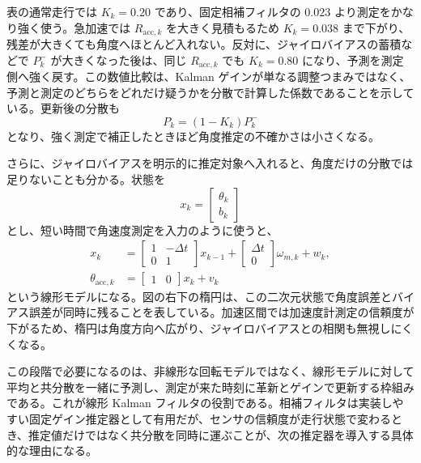 表の通常走行では $K_k=0.20$ であり、固定相補フィルタの $0.023$ より測定をかなり強く使う。急加速では $R_{\mathrm{acc},k}$ を大きく見積もるため $K_k=0.038$ まで下がり、残差が大きくても角度へほとんど入れない。反対に、ジャイロバイアスの蓄積などで $P^-_k$ が大きくなった後は、同じ $R_{\mathrm{acc},k}$ でも $K_k=0.80$ になり、予測を測定側へ強く戻す。この数値比較は、Kalman ゲインが単なる調整つまみではなく、予測と測定のどちらをどれだけ疑うかを分散で計算した係数であることを示している。更新後の分散も
\begin{equation}
  P_k=(1-K_k)P^-_k
\end{equation}
となり、強く測定で補正したときほど角度推定の不確かさは小さくなる。

さらに、ジャイロバイアスを明示的に推定対象へ入れると、角度だけの分散では足りないことも分かる。状態を
\begin{equation}
  x_k=
  \begin{bmatrix}
    \theta_k\\
    b_k
  \end{bmatrix}
\end{equation}
とし、短い時間で角速度測定を入力のように使うと、
\begin{align}
  x_k
  &=
  \begin{bmatrix}
    1 & -\Delta t\\
    0 & 1
  \end{bmatrix}
  x_{k-1}
  +
  \begin{bmatrix}
    \Delta t\\
    0
  \end{bmatrix}
  \omega_{m,k}
  +w_k,\\
  \theta_{\mathrm{acc},k}
  &=
  \begin{bmatrix}
    1 & 0
  \end{bmatrix}
  x_k+v_k
\end{align}
という線形モデルになる。図の右下の楕円は、この二次元状態で角度誤差とバイアス誤差が同時に残ることを表している。加速区間では加速度計測定の信頼度が下がるため、楕円は角度方向へ広がり、ジャイロバイアスとの相関も無視しにくくなる。

この段階で必要になるのは、非線形な回転モデルではなく、線形モデルに対して平均と共分散を一緒に予測し、測定が来た時刻に革新とゲインで更新する枠組みである。これが線形 Kalman フィルタの役割である。相補フィルタは実装しやすい固定ゲイン推定器として有用だが、センサの信頼度が走行状態で変わるとき、推定値だけではなく共分散を同時に運ぶことが、次の推定器を導入する具体的な理由になる。
